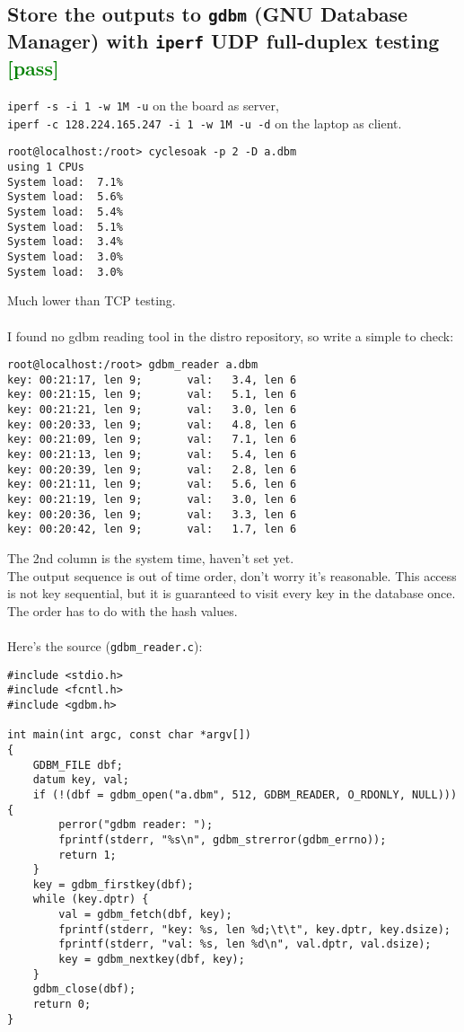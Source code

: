 \documentclass[a4paper]{report}
\begin{document}
\subsection{Store the outputs to {\tt gdbm} (GNU Database Manager) with {\tt iperf} 
            UDP full-duplex testing \textcolor{green}{[pass]}}
{\tt iperf -s -i 1 -w 1M -u} on the board as server,\\
{\tt iperf -c 128.224.165.247 -i 1 -w 1M -u -d} on the laptop as client.
\begin{lstlisting}
root@localhost:/root> cyclesoak -p 2 -D a.dbm
using 1 CPUs
System load:  7.1%
System load:  5.6%
System load:  5.4%
System load:  5.1%
System load:  3.4%
System load:  3.0%
System load:  3.0%
\end{lstlisting}
Much lower than TCP testing.\\\\
I found no gdbm reading tool in the distro repository, so write a simple to check:
\begin{lstlisting}
root@localhost:/root> gdbm_reader a.dbm 
key: 00:21:17, len 9;		val:   3.4, len 6
key: 00:21:15, len 9;		val:   5.1, len 6
key: 00:21:21, len 9;		val:   3.0, len 6
key: 00:20:33, len 9;		val:   4.8, len 6
key: 00:21:09, len 9;		val:   7.1, len 6
key: 00:21:13, len 9;		val:   5.4, len 6
key: 00:20:39, len 9;		val:   2.8, len 6
key: 00:21:11, len 9;		val:   5.6, len 6
key: 00:21:19, len 9;		val:   3.0, len 6
key: 00:20:36, len 9;		val:   3.3, len 6
key: 00:20:42, len 9;		val:   1.7, len 6
\end{lstlisting}
The 2nd column is the system time, haven't set yet.\\
The output sequence is out of time order, don't worry it's reasonable.
This access is not key sequential, but it is guaranteed to visit every key in the database once. 
The order has to do with the hash values.\\\\
Here's the source ({\tt gdbm\_reader.c}):
\begin{lstlisting}
#include <stdio.h>
#include <fcntl.h>
#include <gdbm.h>

int main(int argc, const char *argv[])
{
    GDBM_FILE dbf;
    datum key, val;
    if (!(dbf = gdbm_open("a.dbm", 512, GDBM_READER, O_RDONLY, NULL))) {
        perror("gdbm reader: ");
        fprintf(stderr, "%s\n", gdbm_strerror(gdbm_errno));
        return 1;
    }
    key = gdbm_firstkey(dbf);
    while (key.dptr) {
        val = gdbm_fetch(dbf, key);
        fprintf(stderr, "key: %s, len %d;\t\t", key.dptr, key.dsize);
        fprintf(stderr, "val: %s, len %d\n", val.dptr, val.dsize);
        key = gdbm_nextkey(dbf, key);
    }
    gdbm_close(dbf);
    return 0;
}
\end{lstlisting}\null\\
\end{document}
